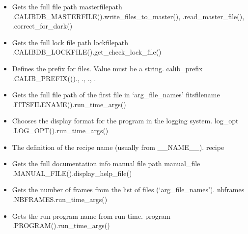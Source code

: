 \begin{itemize}
\item {}
{Gets the full \calibdb file path}
{masterfilepath}
{\AllRecipes}{\spirouConst.CALIBDB\_MASTERFILE()}{\spirouCDB.write\_files\_to\_master(), \spirouCDB.read\_master\_file(), \spirouImage.correct\_for\_dark()}


\item {}
{Gets the full \calibdb lock file path}
{lockfilepath}
{\AllRecipes}{\spirouConst.CALIBDB\_LOCKFILE()}{\spirouCDB.get\_check\_lock\_file()}


\item {}
{Defines the prefix for \calibdb files. Value must be a string.}
{calib\_prefix}
{\AllRecipes}{\spirouConst.CALIB\_PREFIX(()}{\calDARK.\progMAIN, \callocRAW.\progMAIN, \calSLIT.\progMAIN, \calFFraw.\progMAIN}


\item {} 
{Gets the full file path of the first file in `arg\_file\_names'}
{fitsfilename}
{\AllRecipes}{\spirouConst.FITSFILENAME()}{\spirouStartup.run\_time\_args()}


\item {} 
{Chooses the display format for the program in the logging system.}
{log\_opt}
{\AllRecipes}{\spirouConst.LOG\_OPT()}{\spirouStartup.run\_time\_args()}


\item {} 
{The definition of the recipe name (usually from \_\_NAME\_\_).}
{recipe}
{\AllRecipes}{\AllRecipes}{\AllRecipes}


\item {}
{Gets the full documentation info manual file path}
{manual\_file}
{\AllRecipes}{\spirouConst.MANUAL\_FILE()}{\spirouStartup.display\_help\_file()}


\item {} 
{Gets the number of frames from the list of files (`arg\_file\_names').}
{nbframes}
{\AllRecipes}{\spirouConst.NBFRAMES}{\spirouStartup.run\_time\_args()}


\item {}
{Gets the run program name from run time.}
{program}
{\AllRecipes}{\spirouConst.PROGRAM()}{\spirouStartup.run\_time\_args()}



\end{itemize}
